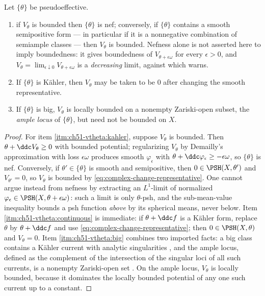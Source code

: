 \begin{proposition}\label{prop:ch51-vtheta-bounded-iff}
Let \(\{\theta\}\) be pseudoeffective.
\begin{enumerate}
\item\label{itm:ch51-vtheta:kahler}
            if \(V_\theta\) is bounded then \(\{\theta\}\) is nef; conversely, if
      \(\{\theta\}\) contains a smooth semipositive form --- in particular if
      it is a nonnegative combination of semiample classes --- then
      \(V_\theta\) is bounded.  Nefness alone is not asserted here to imply
      boundedness: it gives boundedness of \(V_{\theta+\epsilon\omega}\) for
      every \(\epsilon>0\), and
      \(V_\theta=\lim_{\epsilon\downarrow0}V_{\theta+\epsilon\omega}\) is a
      \emph{decreasing} limit, against which
       warns.
\item\label{itm:ch51-vtheta:continuous}
      If \(\{\theta\}\) is K\"ahler, then \(V_\theta\) may be taken to be
      \(0\) after changing the smooth representative.
\item\label{itm:ch51-vtheta:big}
      If \(\{\theta\}\) is big, \(V_\theta\) is locally bounded on a
      nonempty Zariski-open subset, the \emph{ample locus} of
      \(\{\theta\}\), but need not be bounded on \(X\).
\end{enumerate}
\end{proposition}

\begin{proof}
For item \cref{itm:ch51-vtheta:kahler}, suppose \(V_\theta\) is bounded.
Then \(\theta+\ddc V_\theta\geq0\) with bounded potential; regularizing
\(V_\theta\) by Demailly's approximation with loss \(\epsilon\omega\)
produces smooth \(\varphi_\epsilon\) with
\(\theta+\ddc\varphi_\epsilon\geq-\epsilon\omega\), so \(\{\theta\}\) is
nef.  Conversely, if \(\theta'\in\{\theta\}\) is smooth and semipositive, then
\(0\in\PSH(X,\theta')\) and \(V_{\theta'}=0\), so \(V_\theta\) is bounded by
\eqref{eq:complex-change-representative}.  One cannot argue instead from
nefness by extracting an \(L^1\)-limit of normalized
\(\varphi_\epsilon\in\PSH(X,\theta+\epsilon\omega)\): such a limit is only
\(\theta\)-psh, and the sub-mean-value inequality bounds a psh function
\emph{above} by its spherical means, never below.  Item
\cref{itm:ch51-vtheta:continuous} is immediate: if
\(\theta+\ddc f\) is a K\"ahler form, replace \(\theta\) by
\(\theta+\ddc f\) and use \eqref{eq:complex-change-representative}; then
\(0\in\PSH(X,\theta)\) and \(V_\theta=0\).  Item
\cref{itm:ch51-vtheta:big} combines two imported facts: a big class
contains a K\"ahler current with analytic singularities
\cite{Dem92reg,DPS01}, and the ample locus, defined as the complement of
the intersection of the singular loci of all such currents, is a nonempty
Zariski-open set \cite{Bou04}.  On the ample locus, \(V_\theta\) is
locally bounded, because it dominates the locally bounded potential of any
one such current up to a constant.
\end{proof}

